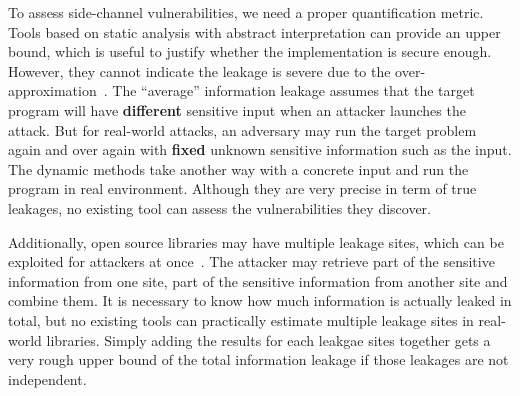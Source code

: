 To assess side-channel vulnerabilities, we need a proper quantification metric.
Tools based on static analysis with abstract interpretation can provide an upper bound, 
which is useful to justify whether the implementation is secure enough. 
However, they cannot indicate the leakage is severe due to the over-approximation~\cite{}. 
The ``average'' information leakage assumes that the target program will have 
\textbf{different} sensitive 
input when an attacker launches the attack.
But for real-world attacks, an adversary may run the target problem again and over again 
with \textbf{fixed} unknown sensitive information such as the input.
The dynamic methods take another way with a concrete input and run the program in real
environment. 
Although they are very precise in term of true leakages, no existing tool can
assess the vulnerabilities they discover.

Additionally, open source libraries may have multiple leakage sites, which can be exploited for attackers
at once~\cite{191010,7163052,hornby2011side}. 
The attacker may retrieve part of the sensitive information from one site, part of the sensitive
information from another site and combine them.
It is necessary to know how much information is actually leaked in total, 
but no existing tools can practically estimate multiple leakage sites in real-world libraries.
Simply adding the results for each leakgae sites together gets a very rough upper bound of 
the total information leakage if those 
leakages are not independent. 

